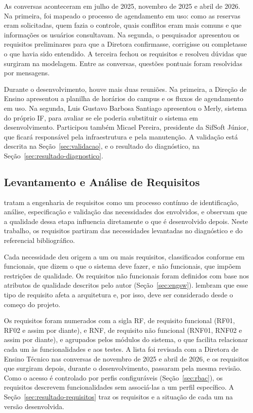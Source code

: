 As conversas aconteceram em julho de 2025, novembro de 2025 e abril de 2026. Na primeira, foi mapeado o processo de agendamento em uso: como as reservas eram solicitadas, quem fazia o controle, quais conflitos eram mais comuns e que informações os usuários consultavam. Na segunda, o pesquisador apresentou os requisitos preliminares para que a Diretora confirmasse, corrigisse ou completasse o que havia sido entendido. A terceira fechou os requisitos e resolveu dúvidas que surgiram na modelagem. Entre as conversas, questões pontuais foram resolvidas por mensagens.

Durante o desenvolvimento, houve mais duas reuniões. Na primeira, a Direção de Ensino apresentou a planilha de horários do campus e os fluxos de agendamento em uso. Na segunda, Luis Gustavo Barbosa Santiago apresentou o Merly, sistema do próprio IF, para avaliar se ele poderia substituir o sistema em desenvolvimento. Participou também Micael Pereira, presidente da SifSoft Júnior, que ficará responsável pela infraestrutura e pela manutenção. A validação está descrita na Seção~\ref{sec:validacao}, e o resultado do diagnóstico, na Seção~\ref{sec:resultado-diagnostico}.

\subsection{Levantamento e Análise de Requisitos}
\label{sec:requisitos}

 tratam a engenharia de requisitos como um processo contínuo de identificação, análise, especificação e validação das necessidades dos envolvidos, e observam que a qualidade dessa etapa influencia diretamente o que é desenvolvido depois. Neste trabalho, os requisitos partiram das necessidades levantadas no diagnóstico e do referencial bibliográfico.

Cada necessidade deu origem a um ou mais requisitos, classificados conforme  em funcionais, que dizem o que o sistema deve fazer, e não funcionais, que impõem restrições de qualidade. Os requisitos não funcionais foram definidos com base nos atributos de qualidade descritos pelo autor (Seção~\ref{sec:engsw}).  lembram que esse tipo de requisito afeta a arquitetura e, por isso, deve ser considerado desde o começo do projeto.

Os requisitos foram numerados com a sigla RF, de requisito funcional (RF01, RF02 e assim por diante), e RNF, de requisito não funcional (RNF01, RNF02 e assim por diante), e agrupados pelos módulos do sistema, o que facilita relacionar cada um às funcionalidades e aos testes. A lista foi revisada com a Diretora de Ensino Técnico nas conversas de novembro de 2025 e abril de 2026, e os requisitos que surgiram depois, durante o desenvolvimento, passaram pela mesma revisão. Como o acesso é controlado por perfis configuráveis (Seção~\ref{sec:rbac}), os requisitos descrevem funcionalidades sem associá-las a um perfil específico. A Seção~\ref{sec:resultado-requisitos} traz os requisitos e a situação de cada um na versão desenvolvida.

